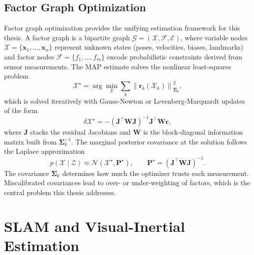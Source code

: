 \subsection{Factor Graph Optimization}
\label{sec:ch2_factor_graph}

Factor graph optimization \cite{dellaert2017factor} provides the unifying estimation framework for this thesis.
A factor graph is a bipartite graph $\mathcal{G} = (\mathcal{X}, \mathcal{F}, \mathcal{E})$, where variable nodes $\mathcal{X} = \{\mathbf{x}_1, \ldots, \mathbf{x}_n\}$ represent unknown states (poses, velocities, biases, landmarks) and factor nodes $\mathcal{F} = \{f_1, \ldots, f_m\}$ encode probabilistic constraints derived from sensor measurements.
The MAP estimate solves the nonlinear least-squares problem
\begin{equation}
\label{eq:ch2:map}
\mathcal{X}^{\star} = \arg\min_{\mathcal{X}} \sum_{k} \left\| \mathbf{r}_k(\mathcal{X}_k) \right\|^2_{\bm{\Sigma}_k},
\end{equation}
which is solved iteratively with Gauss-Newton or Levenberg-Marquardt updates of the form
\begin{equation}
\label{eq:ch2:gn_update}
\delta \mathcal{X}^{\star} = -\left(\mathbf{J}^{\top} \mathbf{W} \mathbf{J}\right)^{-1} \mathbf{J}^{\top} \mathbf{W} \mathbf{r},
\end{equation}
where $\mathbf{J}$ stacks the residual Jacobians and $\mathbf{W}$ is the block-diagonal information matrix built from $\bm{\Sigma}_k^{-1}$.
The marginal posterior covariance at the solution follows the Laplace approximation
\begin{equation}
\label{eq:ch2:laplace}
p(\mathcal{X} \mid \mathcal{Z}) \approx \mathcal{N}(\mathcal{X}^{\star}, \mathbf{P}^{\star}), \qquad \mathbf{P}^{\star} = \left(\mathbf{J}^{\top} \mathbf{W} \mathbf{J}\right)^{-1}.
\end{equation}
The covariance $\bm{\Sigma}_k$ determines how much the optimizer trusts each measurement.
Miscalibrated covariances lead to over- or under-weighting of factors, which is the central problem this thesis addresses.

\section{SLAM and Visual-Inertial Estimation}
\label{sec:ch2_slam}


